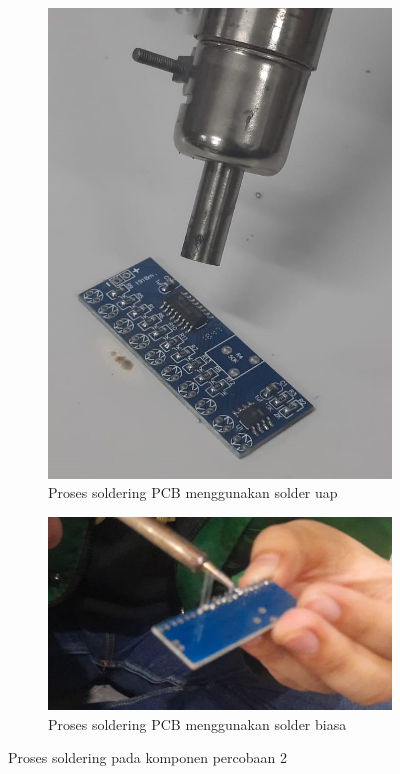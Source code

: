 \begin{figure}[H]
  \centering
  \begin{subfigure}[c]{0.4\linewidth}
    \centering
    \includegraphics[width=\linewidth]{img/modul_2/percobaan2_soldering_uap.jpg}
    \caption{Proses soldering PCB menggunakan solder uap \label{fig:inisub1}}
  \end{subfigure}
  \hspace{1cm}
  \begin{subfigure}[c]{0.4\linewidth}
    \centering
    \includegraphics[width=\linewidth]{img/modul_2/percobaan2_soldering_biasa.jpg}
    \caption{Proses soldering PCB menggunakan solder biasa \label{fig:inisub2}}
  \end{subfigure}
  \caption{Proses soldering pada komponen percobaan 2 \label{fig:keduagambar}}
\end{figure}

